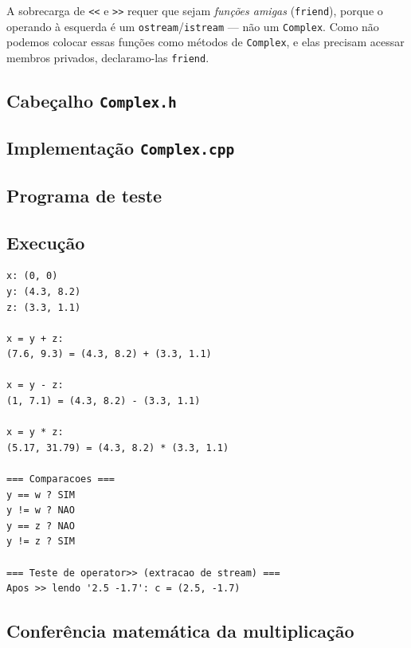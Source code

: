 \documentclass[11pt,a4paper]{article}
\begin{document}
A sobrecarga de \texttt{<<} e \texttt{>>} requer que sejam \emph{fun\c{c}\~oes amigas} (\texttt{friend}), porque o operando \`a esquerda \'e um \texttt{ostream}/\texttt{istream} --- n\~ao um \texttt{Complex}. Como n\~ao podemos colocar essas fun\c{c}\~oes como m\'etodos de \texttt{Complex}, e elas precisam acessar membros privados, declaramo-las \texttt{friend}.

\subsection*{Cabe\c{c}alho \texttt{Complex.h}}



\subsection*{Implementa\c{c}\~ao \texttt{Complex.cpp}}



\subsection*{Programa de teste}



\subsection*{Execu\c{c}\~ao}

\begin{saidabox}
\begin{lstlisting}[style=terminal]
x: (0, 0)
y: (4.3, 8.2)
z: (3.3, 1.1)

x = y + z:
(7.6, 9.3) = (4.3, 8.2) + (3.3, 1.1)

x = y - z:
(1, 7.1) = (4.3, 8.2) - (3.3, 1.1)

x = y * z:
(5.17, 31.79) = (4.3, 8.2) * (3.3, 1.1)

=== Comparacoes ===
y == w ? SIM
y != w ? NAO
y == z ? NAO
y != z ? SIM

=== Teste de operator>> (extracao de stream) ===
Apos >> lendo '2.5 -1.7': c = (2.5, -1.7)
\end{lstlisting}
\end{saidabox}

\subsection*{Confer\^encia matem\'atica da multiplica\c{c}\~ao}
\end{document}

